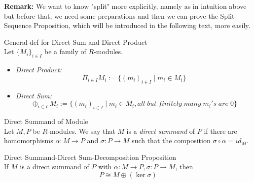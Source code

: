 \noindent\textbf{Remark:} We want to know "split" more explicitly, namely as in intuition above but before that, we need some preparations and then we can prove the Split Sequence Proposition, which will be introduced in the following text, more easily.



\begin{definition}{General def for Direct Sum and Direct Product}\\
Let $\{M_i\}_{i \in I}$ be a family of $R$-modules.
\begin{itemize}
    \item \textit{Direct Product:}
    $$\Pi_{i \in I} M_i := \{(m_i)_{i \in I} \mid m_i \in M_i\}$$
    \item \textit{Direct Sum:}
    $$\oplus _{i \in I} M_i := \{ (m_i)_{i \in I} \mid m_i \in M_i,all\;but\; finitely\; many\; m_i's\;are\;0\}$$
\end{itemize}
\end{definition}


\begin{definition}{Direct Summand of Module}\\
Let $M,P$ be $R$-modules. We say that $M$ is a \textit{direct summand} of $P$ if there are homomorphisms $\alpha:M \to P$ and $\sigma: P\to M$ such that the composition $\sigma \circ \alpha =id_M$.
\end{definition}

\begin{proposition}{Direct Summand-Direct Sum-Decomposition Proposition}\\
If $M$ is a direct summand of $P$ with $\alpha:M \to P,\sigma:P \to M$, then
$$P \cong M \oplus (\ker \sigma)$$
\end{proposition}

